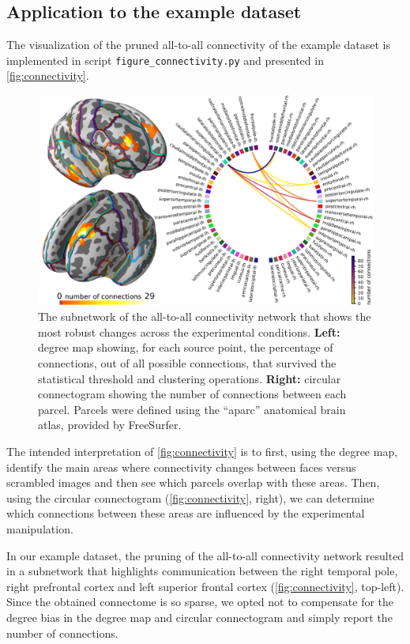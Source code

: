 \documentclass[utf8]{frontiersSCNS}
\newcommand{\code}[1]{\lstinline{#1}}
\begin{document}
\subsection{Application to the example dataset}

The visualization of the pruned all-to-all connectivity of the example dataset is implemented in script \code{figure_connectivity.py} and presented in \autoref{fig:connectivity}.

\begin{figure}
    \includegraphics[width=\textwidth]{figures/connectivity.pdf}
    \caption{The subnetwork of the all-to-all connectivity network that shows the most robust changes across the experimental conditions. \textbf{Left:} degree map showing, for each source point, the percentage of connections, out of all possible connections, that survived the statistical threshold and clustering operations. \textbf{Right:} circular connectogram showing the number of connections between each parcel. Parcels were defined using the ``aparc'' anatomical brain atlas, provided by FreeSurfer.}\label{fig:connectivity}
\end{figure}

The intended interpretation of \autoref{fig:connectivity} is to first, using the degree map, identify the main areas where connectivity changes between faces versus scrambled images and then see which parcels overlap with these areas.
Then, using the circular connectogram (\autoref{fig:connectivity}, right), we can determine which connections between these areas are influenced by the experimental manipulation.

In our example dataset, the pruning of the all-to-all connectivity network resulted in a subnetwork that highlights communication between the right temporal pole, right prefrontal cortex and left superior frontal cortex (\autoref{fig:connectivity}, top-left).
Since the obtained connectome is so sparse, we opted not to compensate for the degree bias in the degree map and circular connectogram and simply report the number of connections.
\end{document}
